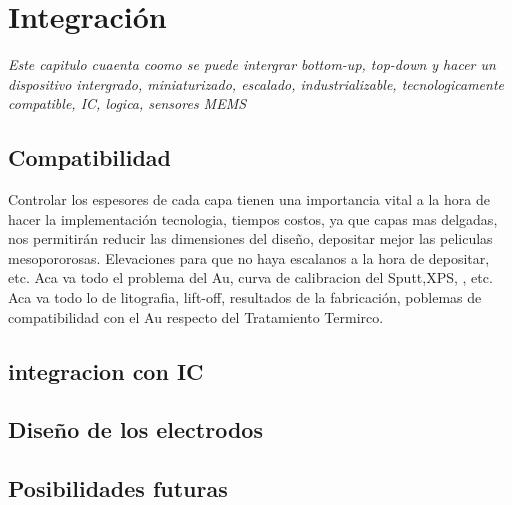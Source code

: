  \newcommand{\NoBiblioInt}[1]{
 \ifthenelse{\equal{#1}{verdadero}}{}{}
 \NoBiblioInt{verdadero}}


 \FormatoCapituloUnaLinea
 
 \chapter{Integración}
 \label{chap:Integracion}

 \thispagestyle{empty}
	
 \noindent\textit{Este capitulo cuaenta coomo se puede intergrar bottom-up, top-down y hacer un dispositivo intergrado, miniaturizado, escalado, industrializable, tecnologicamente compatible, IC, logica, sensores MEMS}

 \vfill
 \minitoc
 \newpage

\section{Compatibilidad}

Controlar los espesores de cada capa tienen una importancia vital a la hora de hacer la implementación tecnologia, tiempos costos, ya que capas mas delgadas, nos permitirán reducir las dimensiones del diseño, depositar mejor las peliculas mesopororosas. Elevaciones para que no haya escalanos a la hora de depositar, etc.
Aca va todo el problema del Au, curva de calibracion del Sputt,XPS, , etc.
Aca va todo lo de litografia, lift-off, resultados de la fabricación, poblemas de compatibilidad con el Au respecto del Tratamiento Termirco.

\section{integracion con IC}

\section{Diseño de los electrodos}

\section{Posibilidades futuras}
